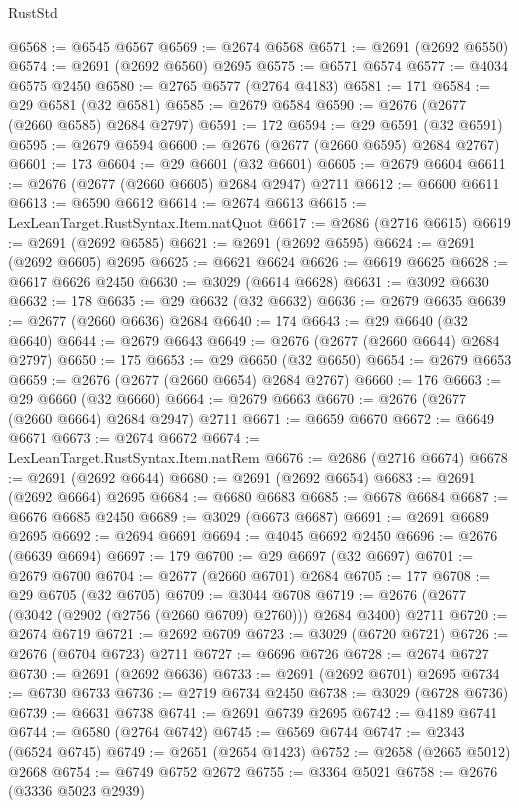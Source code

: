 \begin{lexlean}{RustStd}
\begin{coremodule}
{\begin{coremodule}
{{{{{{{{{{{{{{{{{{{{{{{{{{{{{{{{{{{{{{{{{{{{{{{{{{{{{{{@6568 := @6545 @6567
@6569 := @2674 @6568
@6571 := @2691 (@2692 @6550)
@6574 := @2691 (@2692 @6560) @2695
@6575 := @6571 @6574
@6577 := @4034 @6575 @2450
@6580 := @2765 @6577 (@2764 @4183)
@6581 := 171
@6584 := @29 @6581 (@32 @6581)
@6585 := @2679 @6584
@6590 := @2676 (@2677 (@2660 @6585) @2684 @2797)
@6591 := 172
@6594 := @29 @6591 (@32 @6591)
@6595 := @2679 @6594
@6600 := @2676 (@2677 (@2660 @6595) @2684 @2767)
@6601 := 173
@6604 := @29 @6601 (@32 @6601)
@6605 := @2679 @6604
@6611 := @2676 (@2677 (@2660 @6605) @2684 @2947) @2711
@6612 := @6600 @6611
@6613 := @6590 @6612
@6614 := @2674 @6613
@6615 := LexLeanTarget.RustSyntax.Item.natQuot
@6617 := @2686 (@2716 @6615)
@6619 := @2691 (@2692 @6585)
@6621 := @2691 (@2692 @6595)
@6624 := @2691 (@2692 @6605) @2695
@6625 := @6621 @6624
@6626 := @6619 @6625
@6628 := @6617 @6626 @2450
@6630 := @3029 (@6614 @6628)
@6631 := @3092 @6630
@6632 := 178
@6635 := @29 @6632 (@32 @6632)
@6636 := @2679 @6635
@6639 := @2677 (@2660 @6636) @2684
@6640 := 174
@6643 := @29 @6640 (@32 @6640)
@6644 := @2679 @6643
@6649 := @2676 (@2677 (@2660 @6644) @2684 @2797)
@6650 := 175
@6653 := @29 @6650 (@32 @6650)
@6654 := @2679 @6653
@6659 := @2676 (@2677 (@2660 @6654) @2684 @2767)
@6660 := 176
@6663 := @29 @6660 (@32 @6660)
@6664 := @2679 @6663
@6670 := @2676 (@2677 (@2660 @6664) @2684 @2947) @2711
@6671 := @6659 @6670
@6672 := @6649 @6671
@6673 := @2674 @6672
@6674 := LexLeanTarget.RustSyntax.Item.natRem
@6676 := @2686 (@2716 @6674)
@6678 := @2691 (@2692 @6644)
@6680 := @2691 (@2692 @6654)
@6683 := @2691 (@2692 @6664) @2695
@6684 := @6680 @6683
@6685 := @6678 @6684
@6687 := @6676 @6685 @2450
@6689 := @3029 (@6673 @6687)
@6691 := @2691 @6689 @2695
@6692 := @2694 @6691
@6694 := @4045 @6692 @2450
@6696 := @2676 (@6639 @6694)
@6697 := 179
@6700 := @29 @6697 (@32 @6697)
@6701 := @2679 @6700
@6704 := @2677 (@2660 @6701) @2684
@6705 := 177
@6708 := @29 @6705 (@32 @6705)
@6709 := @3044 @6708
@6719 := @2676 (@2677 (@3042 (@2902 (@2756 (@2660 @6709) @2760))) @2684 @3400) @2711
@6720 := @2674 @6719
@6721 := @2692 @6709
@6723 := @3029 (@6720 @6721)
@6726 := @2676 (@6704 @6723) @2711
@6727 := @6696 @6726
@6728 := @2674 @6727
@6730 := @2691 (@2692 @6636)
@6733 := @2691 (@2692 @6701) @2695
@6734 := @6730 @6733
@6736 := @2719 @6734 @2450
@6738 := @3029 (@6728 @6736)
@6739 := @6631 @6738
@6741 := @2691 @6739 @2695
@6742 := @4189 @6741
@6744 := @6580 (@2764 @6742)
@6745 := @6569 @6744
@6747 := @2343 (@6524 @6745)
@6749 := @2651 (@2654 @1423)
@6752 := @2658 (@2665 @5012) @2668
@6754 := @6749 @6752 @2672
@6755 := @3364 @5021
@6758 := @2676 (@3336 @5023 @2939)
}}}}}}}}}}}}}}}}}}}}}}}}}}}}}}}}}}}}}}}}}}}}}}}}}}}}}}}
\end{coremodule}}
\end{coremodule}
\end{lexlean}
